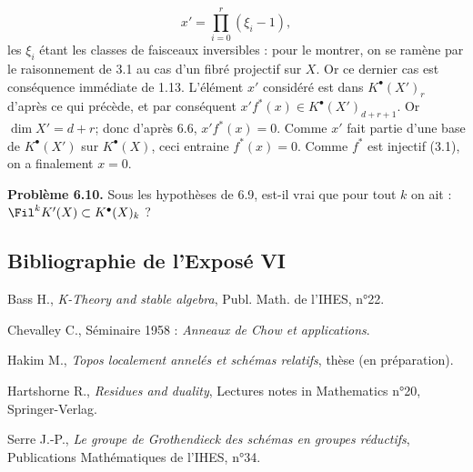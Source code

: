 \[
  x'=\prod_{i=0}^{r}(\xi_i-1),
\]
les $\xi_i$
étant les classes de faisceaux inversibles : pour le montrer, on se ramène par le raisonnement de 3.1 au cas d'un fibré projectif sur $X$. Or ce dernier cas est conséquence immédiate de 1.13. L'élément $x'$ considéré est dans $K^{\bullet}(X')_r$ d'après ce qui précède, et par conséquent $x'f^*(x)\in K^{\bullet}(X')_{d+r+1}$. Or $\dim X'=d+r$; donc d'après 6.6, $x'f^*(x)=0$. Comme $x'$ fait partie d'une base de $K^{\bullet}(X')$ sur $K^{\bullet}(X)$, ceci entraine $f^*(x)=0$. Comme $f^*$ est injectif (3.1), on a finalement $x=0$.

\textbf{Problème 6.10.} Sous les hypothèses de 6.9, est-il vrai que pour tout $k$ on ait : $\Fil^kK'(X)\subset K^{\bullet}(X)_k$ ?

\subsection*{Bibliographie de l'Exposé VI}
\begin{enumerate}[label={\textup{[\arabic*]}}]
\item Bass H., \emph{K-Theory and stable algebra}, Publ. Math. de l'IHES, n°22.
\item Chevalley C., Séminaire 1958 : \emph{Anneaux de Chow et applications}.
\item Hakim M., \emph{Topos localement annelés et schémas relatifs}, thèse (en préparation).
\item Hartshorne R., \emph{Residues and duality}, Lectures notes in Mathematics n°20, Springer-Verlag.
\item Serre J.-P., \emph{Le groupe de Grothendieck des schémas en groupes réductifs}, Publications Mathématiques de l'IHES, n°34.
\end{enumerate}



\providecommand{\Kosz}{\mathrm K}
\providecommand{\Proj}{\operatorname{Proj}}
\providecommand{\Sym}{\operatorname{Sym}}
\providecommand{\gr}{\operatorname{gr}}
\providecommand{\Tor}{\operatorname{Tor}}
\providecommand{\Spec}{\operatorname{Spec}}
\providecommand{\Imf}{\operatorname{Im}}
\providecommand{\Ker}{\operatorname{Ker}}
\providecommand{\Id}{\operatorname{Id}}
\providecommand{\rad}{\operatorname{rad}}
\providecommand{\cO}{\mathcal O}
\providecommand{\cS}{\mathcal S}
\providecommand{\cJ}{\mathcal J}
\providecommand{\cN}{\mathcal N}
\providecommand{\bfP}{\mathbf P}
\providecommand{\bfA}{\mathbf A}


